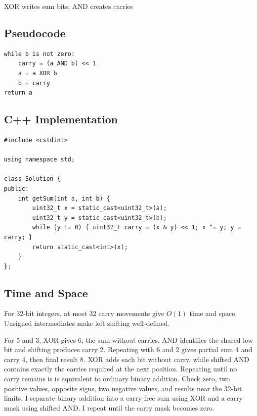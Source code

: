 \begin{visualbox}{XOR writes sum bits; AND creates carries}
\centering
{}
\end{visualbox}

\subsection{Pseudocode}
\begin{lstlisting}[style=pseudocode]
while b is not zero:
    carry = (a AND b) << 1
    a = a XOR b
    b = carry
return a
\end{lstlisting}

\subsection{C++ Implementation}
\begin{lstlisting}[style=compactcode,caption={Complete C++ solution: Sum of Two Integers}]
#include <cstdint>

using namespace std;

class Solution {
public:
    int getSum(int a, int b) {
        uint32_t x = static_cast<uint32_t>(a);
        uint32_t y = static_cast<uint32_t>(b);
        while (y != 0) { uint32_t carry = (x & y) << 1; x ^= y; y = carry; }
        return static_cast<int>(x);
    }
};
\end{lstlisting}

\subsection{Time and Space}
For 32-bit integers, at most 32 carry movements give \(O(1)\) time and space.
Unsigned intermediates make left shifting well-defined.

\lessonexpansion
  {For 5 and 3, XOR gives 6, the sum without carries. AND identifies the
   shared low bit and shifting produces carry 2. Repeating with 6 and 2 gives
   partial sum 4 and carry 4, then final result 8.}
  {XOR adds each bit without carry, while shifted AND contains exactly the
   carries required at the next position. Repeating until no carry remains is
   is equivalent to ordinary binary addition.}
  {Check zero, two positive values, opposite signs, two negative values, and
   results near the 32-bit limits.}
  {I separate binary addition into a carry-free sum using XOR and a carry mask
   using shifted AND. I repeat until the carry mask becomes zero.}

